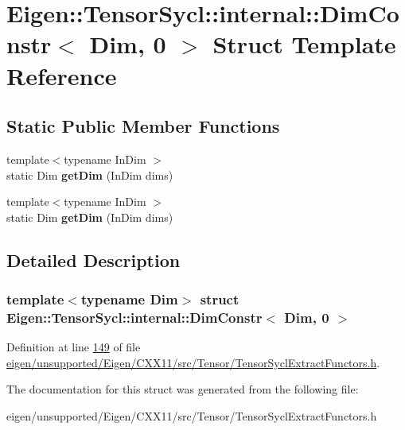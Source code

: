 \hypertarget{struct_eigen_1_1_tensor_sycl_1_1internal_1_1_dim_constr_3_01_dim_00_010_01_4}{}\section{Eigen\+:\+:Tensor\+Sycl\+:\+:internal\+:\+:Dim\+Constr$<$ Dim, 0 $>$ Struct Template Reference}
\label{struct_eigen_1_1_tensor_sycl_1_1internal_1_1_dim_constr_3_01_dim_00_010_01_4}
\subsection*{Static Public Member Functions}
\begin{DoxyCompactItemize}
\item 
\mbox{\label{struct_eigen_1_1_tensor_sycl_1_1internal_1_1_dim_constr_3_01_dim_00_010_01_4_ae1093b92f35f1fabfac2194b7dfdbb9b}} 
{\footnotesize template$<$typename In\+Dim $>$ }\\static Dim {\bfseries get\+Dim} (In\+Dim dims)
\item 
\mbox{\label{struct_eigen_1_1_tensor_sycl_1_1internal_1_1_dim_constr_3_01_dim_00_010_01_4_ae1093b92f35f1fabfac2194b7dfdbb9b}} 
{\footnotesize template$<$typename In\+Dim $>$ }\\static Dim {\bfseries get\+Dim} (In\+Dim dims)
\end{DoxyCompactItemize}


\subsection{Detailed Description}
\subsubsection*{template$<$typename Dim$>$\newline
struct Eigen\+::\+Tensor\+Sycl\+::internal\+::\+Dim\+Constr$<$ Dim, 0 $>$}



Definition at line \hyperlink{eigen_2unsupported_2_eigen_2_c_x_x11_2src_2_tensor_2_tensor_sycl_extract_functors_8h_source_l00149}{149} of file \hyperlink{eigen_2unsupported_2_eigen_2_c_x_x11_2src_2_tensor_2_tensor_sycl_extract_functors_8h_source}{eigen/unsupported/\+Eigen/\+C\+X\+X11/src/\+Tensor/\+Tensor\+Sycl\+Extract\+Functors.\+h}.



The documentation for this struct was generated from the following file\+:\begin{DoxyCompactItemize}
\item 
eigen/unsupported/\+Eigen/\+C\+X\+X11/src/\+Tensor/\+Tensor\+Sycl\+Extract\+Functors.\+h\end{DoxyCompactItemize}
